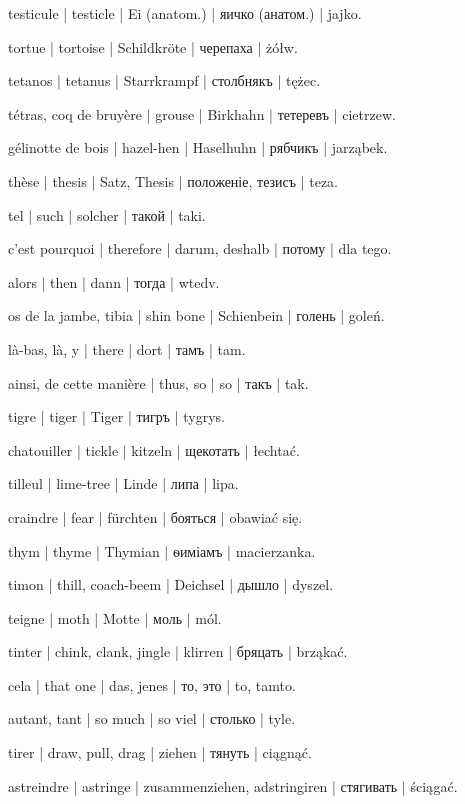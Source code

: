 \begin{outdent}{1em}
testicule | testicle | Ei (anatom.) | яичко (анатом.) | jajko.

tortue | tortoise | Schildkröte | черепаха | żółw.

tetanos | tetanus | Starrkrampf | столбнякъ | tężec.

tétras, coq de bruyère | grouse | Birkhahn | тетеревъ | cietrzew.

gélinotte de bois | hazel-hen | Haselhuhn | рябчикъ | jarząbek.

thèse | thesis | Satz, Thesis | положеніе, тезисъ | teza.

tel | such | solcher | такой | taki.

c’est pourquoi | therefore | darum, deshalb | потому | dla
tego.

alors | then | dann | тогда | wtedv.

os de la jambe, tibia | shin bone | Schienbein | голень | goleń.

là-bas, là, y | there | dort | тамъ | tam.

ainsi, de cette manière | thus, so | so | такъ | tak.

tigre | tiger | Tiger | тигръ | tygrys.

chatouiller | tickle | kitzeln | щекотать | łechtać.

tilleul | lime-tree | Linde | липа | lipa.

craindre | fear | fürchten | бояться | obawiać się.

thym | thyme | Thymian | ѳиміамъ | macierzanka.

timon | thill, coach-beem | Deichsel | дышло | dyszel.

teigne | moth | Motte | моль | mól.

tinter | chink, clank, jingle | klirren | бряцать | brząkać.

cela | that one | das, jenes | то, это | to, tamto.

autant, tant | so much | so viel | столько | tyle.

tirer | draw, pull, drag | ziehen | тянуть | ciągnąć.

\uvsubentry{}
astreindre | astringe | zusammenziehen, adstringiren | стягивать | ściągać.


\end{outdent}

